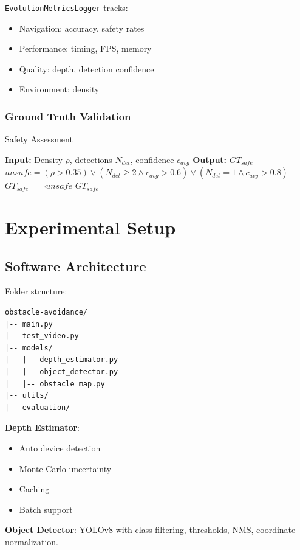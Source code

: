 \documentclass[12pt,oneside]{book}
\begin{document}
\texttt{EvolutionMetricsLogger} tracks:
\begin{itemize}
\item Navigation: accuracy, safety rates
\item Performance: timing, FPS, memory
\item Quality: depth, detection confidence
\item Environment: density
\end{itemize}

\subsubsection{Ground Truth Validation}

\begin{algorithm}
\caption{Safety Assessment}
\begin{algorithmic}
\STATE \textbf{Input:} Density $\rho$, detections $N_{det}$, confidence $c_{avg}$
\STATE \textbf{Output:} $GT_{safe}$
\STATE $unsafe = (\rho>0.35) \lor (N_{det}\geq2 \land c_{avg}>0.6) \lor (N_{det}=1 \land c_{avg}>0.8)$
\STATE $GT_{safe} = \neg unsafe$
\RETURN $GT_{safe}$
\end{algorithmic}
\end{algorithm}

\section{Experimental Setup}

\subsection{Software Architecture}

Folder structure:

\begin{verbatim}
obstacle-avoidance/
|-- main.py
|-- test_video.py
|-- models/
|   |-- depth_estimator.py
|   |-- object_detector.py
|   |-- obstacle_map.py
|-- utils/
|-- evaluation/
\end{verbatim}

\textbf{Depth Estimator}:
\begin{itemize}
\item Auto device detection
\item Monte Carlo uncertainty
\item Caching
\item Batch support
\end{itemize}

\textbf{Object Detector}:
YOLOv8 with class filtering, thresholds, NMS, coordinate normalization.
\end{document}

